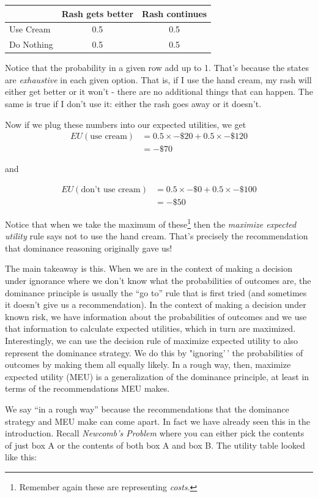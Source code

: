 \documentclass[]{tufte-book}
\begin{document}
\begin{longtable}[]{@{}lcc@{}}
\toprule
& Rash gets better & Rash continues\tabularnewline
\midrule
\endhead
Use Cream & 0.5 & 0.5\tabularnewline
Do Nothing & 0.5 & 0.5\tabularnewline
\bottomrule
\end{longtable}

Notice that the probability in a given row add up to 1. That's because the states are \emph{exhaustive} in each given option. That is, if I use the hand cream, my rash will either get better or it won't - there are no additional things that can happen. The same is true if I don't use it: either the rash goes away or it doesn't.

Now if we plug these numbers into our expected utilities, we get
\[
  \begin{aligned}
  EU(\text{use cream}) &= 0.5\times -\$20 + 0.5\times -\$120\\
  &= -\$70
  \end{aligned}
\]

and

\[
  \begin{aligned}
EU(\text{don't use cream}) &= 0.5\times -\$0 + 0.5\times -\$100 \\ 
  &= -\$50
  \end{aligned}
\]

Notice that when we take the maximum of these\footnote{Remember again these are representing \emph{costs}.} then the \emph{maximize expected utility} rule says not to use the hand cream. That's precisely the recommendation that dominance reasoning originally gave us!

The main takeaway is this. When we are in the context of making a decision under ignorance where we don't know what the probabilities of outcomes are, the dominance principle is usually the ``go to'' rule that is first tried (and sometimes it doesn't give us a recommendation). In the context of making a decision under known risk, we have information about the probabilities of outcomes and we use that information to calculate expected utilities, which in turn are maximized. Interestingly, we can use the decision rule of maximize expected utility to also represent the dominance strategy. We do this by "ignoring'\,' the probabilities of outcomes by making them all equally likely. In a rough way, then, maximize expected utility (MEU) is a generalization of the dominance principle, at least in terms of the recommendations MEU makes.

We say ``in a rough way'' because the recommendations that the dominance strategy and MEU make can come apart. In fact we have already seen this in the introduction. Recall \emph{Newcomb's Problem} where you can either pick the contents of just box A or the contents of both box A and box B. The utility table looked like this:
\end{document}
